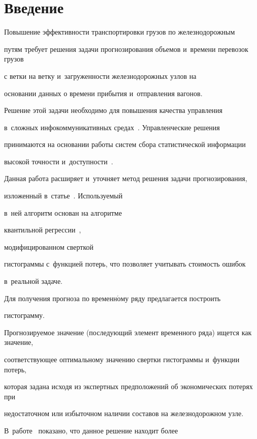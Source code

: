 \section{ Введение}





Повышение эффективности транспортировки грузов по железнодорожным


путям требует решения задачи прогнозирования объемов и~времени перевозок грузов


с ветки на ветку и~загруженности железнодорожных узлов на


основании данных о времени прибытия и~отправления вагонов.


Решение этой задачи необходимо для повышения качества управления


в~сложных инфокоммуникативных средах~\cite{SSI1}. Управленческие решения


принимаются на основании работы систем сбора статистической информации


высокой точности и~доступности~\cite{SSI3, SSI2}.


Данная работа расширяет и~уточняет метод решения задачи прогнозирования,


изложенный в~статье~\cite{Valkov2012NP}. Используемый


в~ней алгоритм основан на алгоритме


квантильной регрессии~\cite{Koenker1978RQ, Postnikova2006KR},


модифицированном сверткой


гистограммы с~функцией потерь, что позволяет учитывать стоимость ошибок


в~реальной задаче.





Для получения прогноза по временн$\acute{\mbox{о}}$му ряду предлагается построить


гис\-то\-грам\-му.


Прогнозируемое значение (последующий элемент временного ряда) ищется как значение,


соответствующее оптимальному значению свертки гистограммы и~функции потерь,


которая задана исходя из экспертных предположений об экономических потерях при


недостаточном или избыточном наличии составов на железнодорожном узле.


В~работе~\cite{Valkov2012NP} показано, что данное решение находит более


